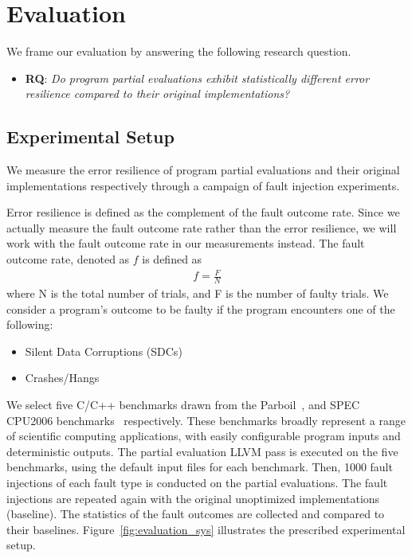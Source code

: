 \section{Evaluation}
\label{sec:evaluation}

We frame our evaluation by answering the following research question. 

\begin{itemize}
\item {\bf RQ}: \textit{Do program partial evaluations exhibit statistically different error resilience compared to their original implementations?}
\end{itemize}

\subsection{Experimental Setup}
\label{sec:exp.setup}

We measure the error resilience of program partial evaluations and their original implementations respectively through a campaign of fault injection experiments. 

Error resilience is defined as the complement of the fault outcome rate.
Since we actually measure the fault outcome rate rather than the error resilience, we will work with the fault outcome rate in our measurements instead.
The fault outcome rate, denoted as $f$ is defined as 
\begin{align*}
f = \frac{F}{N}
\end{align*}
where N is the total number of trials, and F is the number of faulty trials.
We consider a program's outcome to be faulty if the program encounters one of the following:
\begin{itemize}
\item Silent Data Corruptions (SDCs) 
\item Crashes/Hangs
\end{itemize}

\bigbreak

We select five C/C++ benchmarks drawn from the Parboil~\cite{Parboil}, and SPEC CPU2006 benchmarks~\cite{SPEC} respectively.
These benchmarks broadly represent a range of scientific computing applications, with easily configurable program inputs and deterministic outputs.
The partial evaluation LLVM pass is executed on the five benchmarks, using the default input files for each benchmark.
Then, 1000 fault injections of each fault type is conducted on the partial evaluations.
The fault injections are repeated again with the original unoptimized implementations (baseline).
The statistics of the fault outcomes are collected and compared to their baselines. 
Figure~\ref{fig:evaluation_sys} illustrates the prescribed experimental setup.

